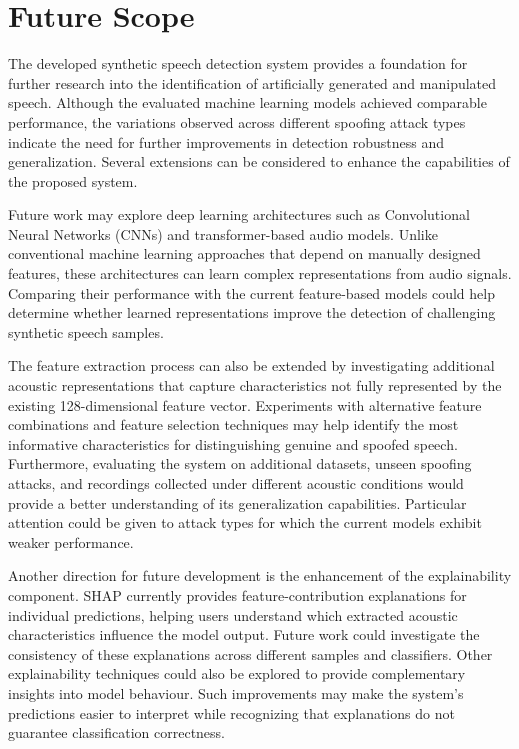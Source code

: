 \documentclass[12pt,a4paper]{report}
\begin{document}
\chapter{Future Scope}

The developed synthetic speech detection system provides a foundation for further research into the identification of artificially generated and manipulated speech. Although the evaluated machine learning models achieved comparable performance, the variations observed across different spoofing attack types indicate the need for further improvements in detection robustness and generalization. Several extensions can be considered to enhance the capabilities of the proposed system.

Future work may explore deep learning architectures such as Convolutional Neural Networks (CNNs) and transformer-based audio models. Unlike conventional machine learning approaches that depend on manually designed features, these architectures can learn complex representations from audio signals. Comparing their performance with the current feature-based models could help determine whether learned representations improve the detection of challenging synthetic speech samples.

The feature extraction process can also be extended by investigating additional acoustic representations that capture characteristics not fully represented by the existing 128-dimensional feature vector. Experiments with alternative feature combinations and feature selection techniques may help identify the most informative characteristics for distinguishing genuine and spoofed speech. Furthermore, evaluating the system on additional datasets, unseen spoofing attacks, and recordings collected under different acoustic conditions would provide a better understanding of its generalization capabilities. Particular attention could be given to attack types for which the current models exhibit weaker performance.

Another direction for future development is the enhancement of the explainability component. SHAP currently provides feature-contribution explanations for individual predictions, helping users understand which extracted acoustic characteristics influence the model output. Future work could investigate the consistency of these explanations across different samples and classifiers. Other explainability techniques could also be explored to provide complementary insights into model behaviour. Such improvements may make the system's predictions easier to interpret while recognizing that explanations do not guarantee classification correctness.
\end{document}
